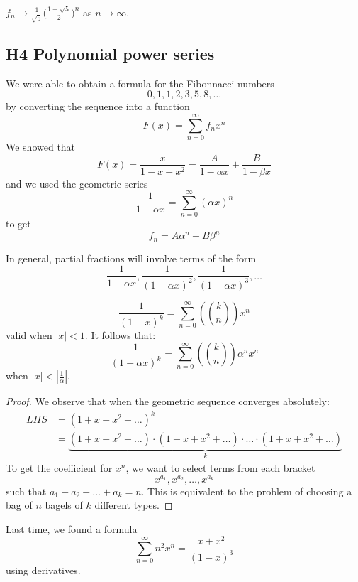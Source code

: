 \documentclass[12pt]{article}
\begin{document}
\begin{corollary}
    $\displaystyle
				f_n \to \frac{1}{\sqrt{5}} \bigg( \frac{1 + \sqrt{5}}{2}\bigg)^n$ as $n\to \infty$.
\end{corollary}

\subsection{H4 Polynomial power series}

We were able to obtain a formula for the Fibonnacci numbers \[0,1,1,2,3,5,8,\dots\]
by converting the sequence into a function \[F(x)=\sum_{n=0}^{\infty}f_nx^n\]
We showed that \[F(x)=\frac{x}{1-x-x^2} = \frac{A}{1-\alpha x}+\frac{B}{1-\beta x}\]
and we used the geometric series \[\frac{1}{1-\alpha x}=\sum_{n=0}^{\infty}(\alpha x)^n\]
to get \[f_n=A\alpha^n +B\beta^n\]
\spl

In general, partial fractions will involve terms of the form \[\frac{1}{1-\alpha x},\frac{1}{(1-\alpha x)^2},\frac{1}{(1-\alpha x)^3},\dots\]

\begin{theorem}
    \[\frac{1}{(1-x)^k}=\sum_{n=0}^{\infty}\left({k\choose n}\right)x^n\]
    valid when $|x|<1$. 
    It follows that:
    \[\frac{1}{(1-\alpha x)^k}=\sum_{n=0}^{\infty}\left({k\choose n}\right)\alpha^nx^n\] when \(|x|<\left|\frac{1}{\alpha}\right|\).
\end{theorem}

\begin{proof}
    We observe that when the geometric sequence converges absolutely: \begin{align*}
        LHS &= (1+x+x^2+\dots)^k\\
        &= \underset{k}{\underbrace{(1+x+x^2+\dots)\cdot (1+x+x^2+\dots)\cdot \dots \cdot (1+x+x^2+\dots)}}
    \end{align*}
    To get the coefficient for $x^n$, we want to select terms from each bracket \[x^{a_1},x^{a_2},\dots,x^{a_k}\]
    such that $a_1+a_2+\dots+a_k=n$. This is equivalent to the problem of choosing a bag of $n$ bagels of $k$ different types.
\end{proof}

\spl

Last time, we found a formula \[\sum_{n=0}^{\infty}n^2x^n = \frac{x+x^2}{(1-x)^3}\] using derivatives.
\end{document}
